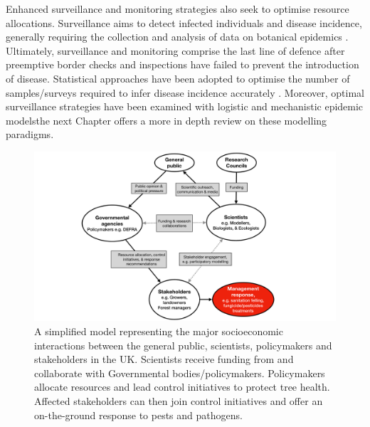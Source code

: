 Enhanced surveillance and monitoring strategies also seek to optimise resource allocations. 
Surveillance aims to detect infected individuals and disease incidence, generally requiring the collection and analysis of data on botanical epidemics \cite{surveillance-review}.
Ultimately, surveillance and monitoring comprise the last line of defence after preemptive border checks and inspections have failed to prevent the introduction of disease. 
Statistical approaches have been adopted to optimise the number of samples/surveys required to infer disease incidence accurately \cite{yamamura2016sampling}.
Moreover, optimal surveillance strategies have been examined with logistic \cite{parnell2012estimating} 
and mechanistic \cite{WEBIDEMICS} epidemic models\textemdash the next Chapter offers a more in depth review on these modelling paradigms.

\begin{figure}
    \centering
    \includegraphics[scale=0.35]{chapter1/figures/modelling-and-policy.pdf}
    \caption{A simplified model representing the major socioeconomic interactions between the general public, scientists, 
    policymakers and stakeholders in the UK. Scientists receive funding from and collaborate with Governmental bodies/policymakers. 
    Policymakers allocate resources and lead control initiatives to protect tree health. 
    Affected stakeholders can then join control initiatives and offer an on-the-ground response to pests and pathogens.}
    \label{fig:modelling-and-policies}
\end{figure}

